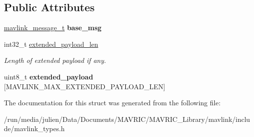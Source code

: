 \subsection*{Public Attributes}
\begin{DoxyCompactItemize}
\item 
\hypertarget{struct____mavlink__extended__message_a52d142dbcf71540bfc8199b45f676126}{\hyperlink{struct____mavlink__message}{mavlink\+\_\+message\+\_\+t} {\bfseries base\+\_\+msg}}\label{struct____mavlink__extended__message_a52d142dbcf71540bfc8199b45f676126}

\item 
\hypertarget{struct____mavlink__extended__message_a7fcf54d2c29dc157a78caacae8d998cf}{int32\+\_\+t \hyperlink{struct____mavlink__extended__message_a7fcf54d2c29dc157a78caacae8d998cf}{extended\+\_\+payload\+\_\+len}}\label{struct____mavlink__extended__message_a7fcf54d2c29dc157a78caacae8d998cf}

\begin{DoxyCompactList}\small\item\em Length of extended payload if any. \end{DoxyCompactList}\item 
\hypertarget{struct____mavlink__extended__message_afccf6dc3341050b0a63ac0d069d66a31}{uint8\+\_\+t {\bfseries extended\+\_\+payload} \mbox{[}M\+A\+V\+L\+I\+N\+K\+\_\+\+M\+A\+X\+\_\+\+E\+X\+T\+E\+N\+D\+E\+D\+\_\+\+P\+A\+Y\+L\+O\+A\+D\+\_\+\+L\+E\+N\mbox{]}}\label{struct____mavlink__extended__message_afccf6dc3341050b0a63ac0d069d66a31}

\end{DoxyCompactItemize}


The documentation for this struct was generated from the following file\+:\begin{DoxyCompactItemize}
\item 
/run/media/julien/\+Data/\+Documents/\+M\+A\+V\+R\+I\+C/\+M\+A\+V\+R\+I\+C\+\_\+\+Library/mavlink/include/mavlink\+\_\+types.\+h\end{DoxyCompactItemize}
